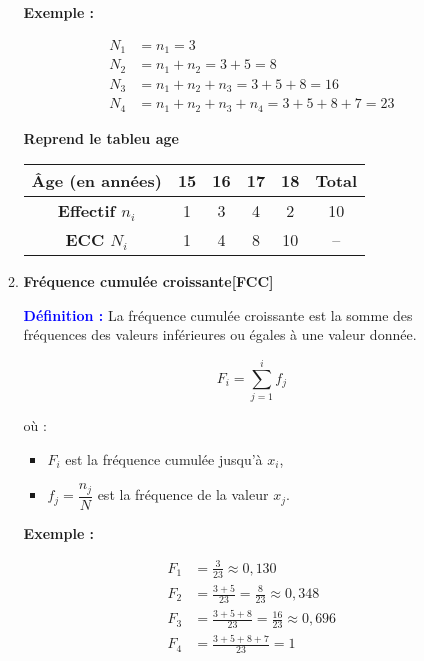 \documentclass[a4paper,12pt]{article}
\begin{document}
\begin{enumerate}[leftmargin=1.5cm, label=\textbf{\arabic*)}]
\begin{enumerate}
\vspace{0.3cm}

\textbf{Exemple :}

\[
\begin{aligned}
N_1 &= n_1 = 3 \\
N_2 &= n_1 + n_2 = 3 + 5 = 8 \\
N_3 &= n_1 + n_2 + n_3 = 3 + 5 + 8 = 16 \\
N_4 &= n_1 + n_2 + n_3 + n_4 = 3 + 5 + 8 + 7 = 23
\end{aligned}
\]

\textbf{Reprend le tableu age}

\begin{center}
\begin{tabular}{|c|c|c|c|c|c|}
    \hline
    \textbf{Âge (en années)} & 15 & 16 & 17 & 18 & \textbf{Total} \\
    \hline
    \textbf{Effectif \( n_i \)} & 1 & 3 & 4 & 2 & 10 \\
    \hline
    \textbf{ECC \( N_i \)} & 1 & 4 & 8 & 10 & -- \\
    \hline
\end{tabular}
\end{center}


\item \textbf{Fréquence cumulée croissante[FCC]} \\

\begin{tcolorbox}[colback=red!5!white, colframe=red!60!black, boxrule=0.5pt]
\textcolor{blue}{\textbf{Définition :}}  
La fréquence cumulée croissante est la somme des fréquences des valeurs inférieures ou égales à une valeur donnée.

\[
F_i = \sum_{j=1}^{i} f_j
\]

où :
\begin{itemize}
    \item \( F_i \) est la fréquence cumulée jusqu’à \( x_i \),
    \item \( f_j = \dfrac{n_j}{N} \) est la fréquence de la valeur \( x_j \).
\end{itemize}
\end{tcolorbox}

\vspace{0.3cm}

\textbf{Exemple :}

\[
\begin{aligned}
F_1 &= \frac{3}{23} \approx 0{,}130 \\
F_2 &= \frac{3+5}{23} = \frac{8}{23} \approx 0{,}348 \\
F_3 &= \frac{3+5+8}{23} = \frac{16}{23} \approx 0{,}696 \\
F_4 &= \frac{3+5+8+7}{23} = 1
\end{aligned}
\]


\end{enumerate}
\end{enumerate}
\end{document}
